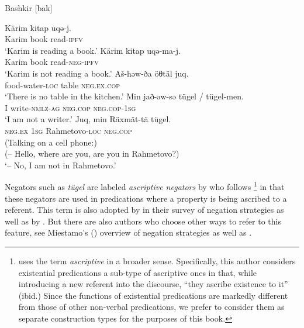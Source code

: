 \documentclass[output=paper,chinesefont,colorlinks,citecolor=brown]{langscibook}
\begin{document}
\begin{exe}
\ex Bashkir [bak]  \label{ex:bashkir-1}
\begin{xlist}
\ex \label{ex:bashkir-1a}
\gll Kärim kitap uqə-j.\\
Karim book read-\textsc{ipfv}\\
\glt `Karim is reading a book.'
\ex \label{ex:bashkir-1b}
\gll Kärim kitap uqə-ma-j.\\
Karim book read-\textsc{neg-ipfv}\\
\glt `Karim is not reading a book.'
\ex \label{ex:bashkir-1c}
\gll Aš-həw-ða öθtäl juq.\\
food-water-\textsc{loc} table \textsc{neg.ex.cop}\\
\glt `There is no table in the kitchen.'
\ex \label{ex:bashkir-1d}
\gll Min jað-əw-sə tügel {/ tügel-men.}\\
I write-\textsc{nmlz-ag} \textsc{neg.cop} \textsc{neg.cop-1sg}\\
\glt `I am not a writer.'
\ex \label{ex:bashkir-1e}
\gll Juq, min Räxmät-tä tügel.\\
\textsc{neg.ex} \textsc{1sg} Rahmetovo-\textsc{loc} \textsc{neg.cop}\\
\glt (Talking on a cell phone:)\\ (– Hello, where are you, are you in Rahmetovo?)\\ `– No, I am not in Rahmetovo.'
\end{xlist}
\end{exe}
Negators such as \textit{tügel} are labeled \textit{ascriptive negators} by \citet{Veselinova2015} who follows \citet[148]{lyonsPossession1967}\footnote{\citet[102--103]{hengeveld1992} uses the term \textit{ascriptive} in a broader sense. Specifically, this author considers existential predications a sub-type of ascriptive ones in that, while introducing a new referent into the discourse, “they ascribe existence to it” (ibid.) Since the functions of existential predications are markedly different from those of other non-verbal predications, we prefer to consider them as separate construction types for the purposes of  this book.} in that these negators are used in predications where a property is being ascribed to a referent. This term is also adopted by \citet{auwerakrasnoukhova2020} in their survey of negation strategies as well as by . But there are also authors who choose other ways to refer to this feature, see Miestamo's (\citeyear{miestamo2017a}) overview of negation strategies as well as \citet{eriksen2011}.
\end{document}

